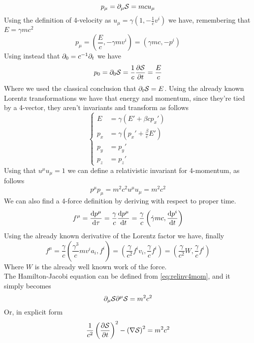 \documentclass[../admech.tex]{subfiles}
\begin{document}
\begin{equation}
	p_\mu=\partial_\mu\mathcal{S}=mcu_\mu
	\label{eq:4momentumrel}
\end{equation}
Using the definition of 4-velocity as $u_\mu=\gamma\left(1,-\frac{1}{c}v^i\right)$ we have, remembering that $E=\gamma mc^2$
\begin{equation}
	p_\mu=\left( \frac{E}{c},-\gamma mv^i \right)=\left( \gamma mc,-p^i \right)
	\label{eq:4momentum2}
\end{equation}
Using instead that $\partial_0=c^{-1}\partial_t$ we have
\begin{equation}
	p_0=\partial_0\mathcal{S}=\frac{1}{c}\pdv{\mathcal{S}}{t}=\frac{E}{c}
	\label{eq:0comp4mom}
\end{equation}
Where we used the classical conclusion that $\partial_t\mathcal{S}=E$. Using the already known Lorentz transformations we have that energy and momentum, since they're tied by a 4-vector, they aren't invariants and transform as follows
\begin{equation}
	\left\{ \begin{aligned}
			E&=\gamma\left( E'+\beta cp_x' \right)\\
			p_x&=\gamma\left( p_x'+\frac{\beta}{c}E' \right)\\
			p_y&=p_y'\\
			p_z&=p_z'
	\end{aligned}\right.
	\label{eq:energymomtrans}
\end{equation}
Using that $u^\mu u_\mu=1$ we can define a relativistic invariant for 4-momentum, as follows
\begin{equation}
	p^\mu p_\mu=m^2c^2u^\mu u_\mu=m^2c^2
	\label{eq:relinv4mom}
\end{equation}
We can also find a 4-force definition by deriving with respect to proper time.
\begin{equation}
	f^\mu=\dv{p^\mu}{\tau}=\frac{\gamma}{c}\dv{p^\mu}{t}=\frac{\gamma}{c}\left( \dot{\gamma}mc,\dv{p^i}{t} \right)
	\label{eq:4-force}
\end{equation}
Using the already known derivative of the Lorentz factor we have, finally
\begin{equation}
	f^\mu=\frac{\gamma}{c}\left( \frac{\gamma^3}{c}mv^ia_i,f^i \right)=\left( \frac{\gamma}{c^2}f^iv_i,\frac{\gamma}{c}f^i \right)=\left( \frac{\gamma}{c^2}W,\frac{\gamma}{c}f^i \right)
	\label{eq:4force}
\end{equation}
Where $W$ is the already well known work of the force.\\
The Hamilton-Jacobi equation can be defined from \eqref{eq:relinv4mom}, and it simply becomes
\begin{equation}
	\partial_\mu\mathcal{S}\partial^\mu\mathcal{S}=m^2c^2
	\label{eq:hjrel}
\end{equation}
Or, in explicit form
\begin{equation}
	\frac{1}{c^2}\left( \pdv{\mathcal{S}}{t} \right)^2-\left( \nabla\mathcal{S} \right)^2=m^2c^2
	\label{eq:hjrelexpl}
\end{equation}
\end{document}
